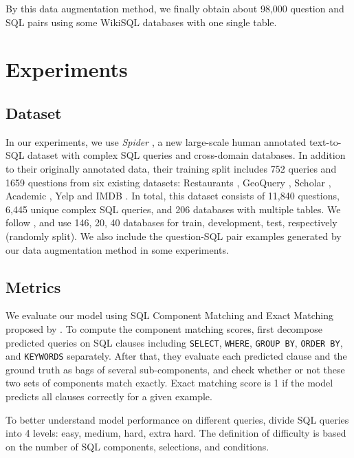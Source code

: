 \documentclass[11pt,a4paper]{article}
\begin{document}
By this data augmentation method, we finally obtain about 98,000 question and SQL pairs using some WikiSQL databases with one single table.


\section{Experiments}

\subsection{Dataset}
In our experiments, we use \textit{Spider} \cite{Yu&al.18.emnlp.corpus}, a new large-scale human annotated text-to-SQL dataset with complex SQL queries and cross-domain databases. In addition to their originally annotated data, their training split includes 752 queries and 1659 questions from six existing datasets: Restaurants \cite{tang2001using,Popescu03}, GeoQuery \cite{zelle96}, Scholar \cite{iyer17}, Academic \cite{li2014constructing}, Yelp and IMDB \cite{Yaghmazadeh17}.
In total, this dataset consists of 11,840 questions, 6,445 unique complex SQL queries, and 206 databases with multiple tables.
We follow \cite{Yu&al.18.emnlp.corpus}, and use 146, 20, 40 databases for train, development, test, respectively (randomly split).
We also include the question-SQL pair examples generated by our data augmentation method in some experiments.


\subsection{Metrics}
We evaluate our model using SQL Component Matching and Exact Matching proposed by \cite{Yu&al.18.emnlp.corpus}.
To compute the component matching scores, \citet{Yu&al.18.emnlp.corpus} first decompose predicted queries on SQL clauses including \texttt{SELECT}, \texttt{WHERE}, \texttt{GROUP BY}, \texttt{ORDER BY}, and \texttt{KEYWORDS} separately.
After that, they evaluate each predicted clause and the ground truth as bags of several sub-components, and check whether or not these two sets of components match exactly.
Exact matching score is 1 if the model predicts all clauses correctly for a given example.

To better understand model performance on different queries, 
\cite{Yu&al.18.emnlp.corpus} divide SQL queries into 4 levels: easy, medium, hard, extra hard. The definition of difficulty is based on the number of SQL components, selections, and conditions. 
\end{document}
